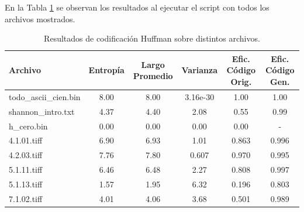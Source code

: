 \documentclass[conference,onecolumn,12pt]{IEEEtran}
\numberwithin{equation}{subsection}
\begin{document}
En la Tabla \ref{tab:huffman_resultados} se observan los resultados al ejecutar el script con todos los archivos mostrados.

\hfill\break \hfill\break \hfill\break \hfill\break \hfill\break
\hfill\break \hfill\break 


 \begin{table}[h!]
    \centering
    \caption{Resultados de codificación Huffman sobre distintos archivos.}
    \label{tab:huffman_resultados}
    \begin{tabular}{lccccc}
    \toprule
    \textbf{Archivo} & \textbf{Entropía} & \textbf{Largo Promedio} & \textbf{Varianza} & \textbf{Efic. Código Orig.} & \textbf{Efic. Código Gen.} \\
    \midrule
    todo\_ascii\_cien.bin & 8.00 & 8.00 & 3.16e-30 & 1.00 & 1.00 \\
    shannon\_intro.txt & 4.37 & 4.40 & 2.08 & 0.55 & 0.99 \\
    h\_cero.bin & 0.00 & 0.00 & 0.00 & 0.00 & - \\
    4.1.01.tiff & 6.90 & 6.93 & 1.01 & 0.863 & 0.996 \\
    4.2.03.tiff & 7.76 & 7.80 & 0.607 & 0.970 & 0.995 \\
    5.1.11.tiff & 6.46 & 6.48 & 2.27 & 0.808 & 0.997 \\
    5.1.13.tiff & 1.57 & 1.95 & 6.32 & 0.196 & 0.803 \\
    7.1.02.tiff & 4.01 & 4.06 & 3.68 & 0.501 & 0.989 \\
    \bottomrule
    \end{tabular}
\end{table}
\end{document}
